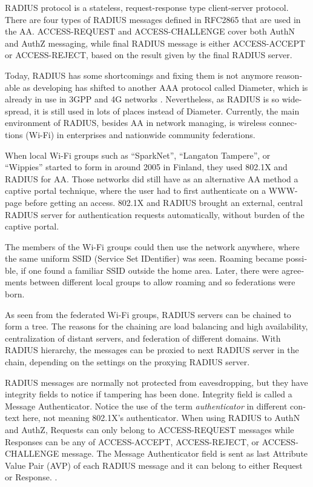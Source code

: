 \documentclass[12pt,a4paper,english]{tutthesis}
\begin{document}
\begin{otherlanguage}{english}
RADIUS protocol is a stateless, request-response type client-server
protocol. 
There are four types of RADIUS messages defined in RFC2865 that are
used in the AA. ACCESS-REQUEST and ACCESS-CHALLENGE cover both AuthN and
AuthZ messaging, while final RADIUS message is either
ACCESS-ACCEPT or ACCESS-REJECT, based on the
result given by the final RADIUS  server.

Today, RADIUS has some shortcomings and fixing them is not anymore
reasonable as developing has shifted to another AAA protocol called
Diameter, which is already in use in 3GPP and 4G
networks \cite{diameter}.  Nevertheless, as RADIUS is so wide-spread,
it is still used in lots of places instead of Diameter.  Currently,
the main environment of RADIUS, besides AA in network managing, is wireless
connections (Wi-Fi) in enterprises and nationwide community
federations.


When local Wi-Fi groups  such as ``SparkNet'', ``Langaton
Tampere'', or ``Wippies'' started to form  in around 2005 in Finland, they used
802.1X and RADIUS for AA. Those networks did still have as an
alternative AA method a captive portal technique, where the user had to
first authenticate on a WWW-page before getting an access.  802.1X and
RADIUS brought an external, central RADIUS server for authentication
requests automatically, without burden of the captive portal.

The members of the Wi-Fi groups could then use the network anywhere, where
the same uniform SSID (Service Set IDentifier) was seen. Roaming
became possible, if one found a familiar SSID outside the home area.
Later, there were agreements between different local groups to allow
roaming and so federations were born.

As seen from the federated Wi-Fi groups, RADIUS servers can be chained to
form a tree. The reasons for the chaining are load balancing and high
availability, centralization of distant servers, and
federation of different domains. With RADIUS hierarchy, the messages
can be proxied to next RADIUS server in the chain, depending on the settings
on the proxying RADIUS server.

RADIUS messages are normally not protected from eavesdropping, but they have
integrity fields to notice if tampering has been done. 
Integrity field is called a Message Authenticator.
Notice the use of the term \emph{authenticator} in different context here, not
meaning 802.1X's authenticator.
When using RADIUS to AuthN and AuthZ, Requests can only belong to ACCESS-REQUEST messages while
Responses can be any of ACCESS-ACCEPT, ACCESS-REJECT, or ACCESS-CHALLENGE message.
The Message Authenticator field is sent as last Attribute Value Pair (AVP)
of each RADIUS message and it can belong 
to either Request or Response. \cite[p.20]{radiusbook}.


\end{otherlanguage}
\end{document}
